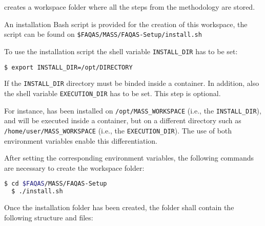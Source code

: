 \MASS creates a workspace folder where all the steps from the methodology are stored.

An installation Bash script is provided for the creation of this workspace, the script can be found on \texttt{\$FAQAS/MASS/FAQAS-Setup/install.sh}

To use the installation script the shell variable \texttt{INSTALL\_DIR} has to be set:

\begin{lstlisting}[language=bash]
  $ export INSTALL_DIR=/opt/DIRECTORY
\end{lstlisting}

If the \texttt{INSTALL\_DIR} directory must be binded inside a container. In addition, also the shell variable \texttt{EXECUTION\_DIR} has to be set. This step is optional.

For instance, \MASS has been installed on \texttt{/opt/MASS\_WORKSPACE} (i.e., the \texttt{INSTALL\_DIR}), and \MASS will be executed inside a container, but on a different directory such as \\\texttt{/home/user/MASS\_WORKSPACE} (i.e., the \texttt{EXECUTION\_DIR}). The use of both environment variables enable this differentiation.


After setting the corresponding environment variables, the following commands are necessary to create the \MASS workspace folder:

\begin{lstlisting}[language=bash]
  $ cd $FAQAS/MASS/FAQAS-Setup
  $ ./install.sh
\end{lstlisting}

Once the installation folder has been created, the folder shall contain the following structure and files:

